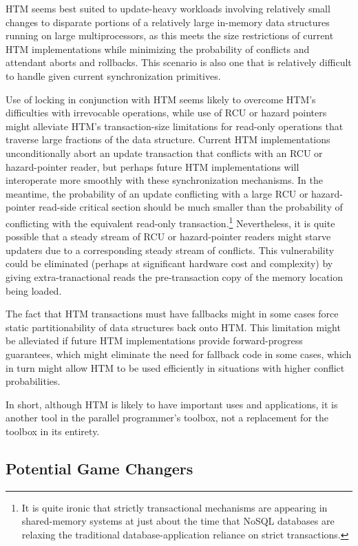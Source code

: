 HTM seems best suited to update-heavy workloads involving relatively
small changes to disparate portions of a relatively large in-memory
data structures running on large multiprocessors,
as this meets the size restrictions of current HTM implementations while
minimizing the probability of conflicts and attendant aborts and
rollbacks.
This scenario is also one that is relatively difficult to handle given
current synchronization primitives.

Use of locking in conjunction with HTM seems likely to overcome HTM's
difficulties with irrevocable operations, while use of RCU or
hazard pointers might alleviate HTM's transaction-size limitations
for read-only operations that traverse large fractions of the data
structure.
Current HTM implementations unconditionally abort an update transaction
that conflicts with an RCU or hazard-pointer reader, but perhaps future
HTM implementations will interoperate more smoothly with these
synchronization mechanisms.
In the meantime, the probability of an update conflicting with a
large RCU or hazard-pointer read-side critical section should be
much smaller than the probability of conflicting with the equivalent
read-only transaction.\footnote{
	It is quite ironic that strictly transactional mechanisms are
	appearing in shared-memory systems at just about the time
	that NoSQL databases are relaxing the traditional
	database-application reliance on strict transactions.}
Nevertheless, it is quite possible that a steady stream of RCU or
hazard-pointer readers might starve updaters due to a corresponding
steady stream of conflicts.
This vulnerability could be eliminated (perhaps at significant
hardware cost and complexity) by giving extra-tranactional
reads the pre-transaction copy of the memory location being loaded.

The fact that HTM transactions must have fallbacks might in some cases
force static partitionability of data structures back onto HTM.
This limitation might be alleviated if future HTM implementations
provide forward-progress guarantees, which might eliminate the need
for fallback code in some cases, which in turn might allow HTM to
be used efficiently in situations with higher conflict probabilities.

In short, although HTM is likely to have important uses and applications,
it is another tool in the parallel programmer's toolbox, not a replacement
for the toolbox in its entirety.

\subsection{Potential Game Changers}
\label{sec:future:Potential Game Changers}

